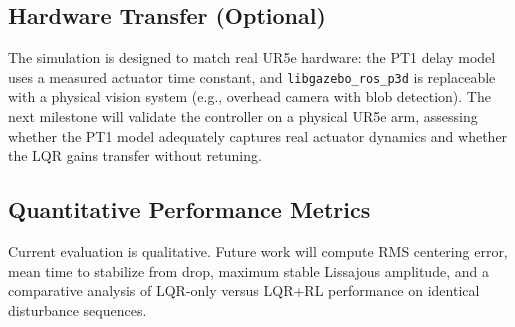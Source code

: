 \documentclass[journal]{IEEEtran}
\begin{document}
\subsection{Hardware Transfer (Optional)}
The simulation is designed to match real UR5e hardware: the PT1 delay model uses a measured actuator time
constant, and \texttt{libgazebo\_ros\_p3d} is replaceable with a physical vision system (e.g., overhead
camera with blob detection). The next milestone will validate the controller on a physical UR5e arm,
assessing whether the PT1 model adequately captures real actuator dynamics and whether the LQR gains
transfer without retuning.


\subsection{Quantitative Performance Metrics}
Current evaluation is qualitative. Future work will compute RMS centering error, mean time to stabilize
from drop, maximum stable Lissajous amplitude, and a comparative analysis of LQR-only versus LQR+RL
performance on identical disturbance sequences.

\end{document}
